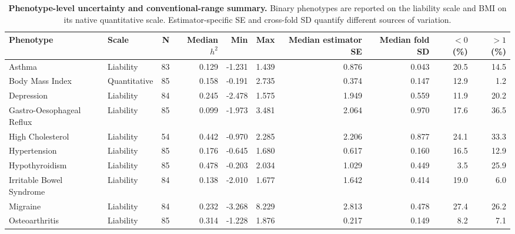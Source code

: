 \begin{table}[!ht]
\centering
\caption{\textbf{Phenotype-level uncertainty and conventional-range summary.} Binary phenotypes are reported on the liability scale and BMI on its native quantitative scale. Estimator-specific SE and cross-fold SD quantify different sources of variation.}
\label{tab:phenotype_uncertainty}
\scriptsize
\begin{tabular}{llrrrrrrrr}
\toprule
Phenotype & Scale & N & Median $h^2$ & Min & Max & Median estimator SE & Median fold SD & $<0$ (\%) & $>1$ (\%) \\
\midrule
Asthma & Liability & 83 & 0.129 & -1.231 & 1.439 & 0.876 & 0.043 & 20.5 & 14.5 \\
Body Mass Index & Quantitative & 85 & 0.158 & -0.191 & 2.735 & 0.374 & 0.147 & 12.9 & 1.2 \\
Depression & Liability & 84 & 0.245 & -2.478 & 1.575 & 1.949 & 0.559 & 11.9 & 20.2 \\
Gastro-Oesophageal Reflux & Liability & 85 & 0.099 & -1.973 & 3.481 & 2.064 & 0.970 & 17.6 & 36.5 \\
High Cholesterol & Liability & 54 & 0.442 & -0.970 & 2.285 & 2.206 & 0.877 & 24.1 & 33.3 \\
Hypertension & Liability & 85 & 0.176 & -0.645 & 1.680 & 0.617 & 0.160 & 16.5 & 12.9 \\
Hypothyroidism & Liability & 85 & 0.478 & -0.203 & 2.034 & 1.029 & 0.449 & 3.5 & 25.9 \\
Irritable Bowel Syndrome & Liability & 84 & 0.138 & -2.010 & 1.677 & 1.642 & 0.414 & 19.0 & 6.0 \\
Migraine & Liability & 84 & 0.232 & -3.268 & 8.229 & 2.813 & 0.478 & 27.4 & 26.2 \\
Osteoarthritis & Liability & 85 & 0.314 & -1.228 & 1.876 & 0.217 & 0.149 & 8.2 & 7.1 \\
\bottomrule
\end{tabular}
\end{table}
